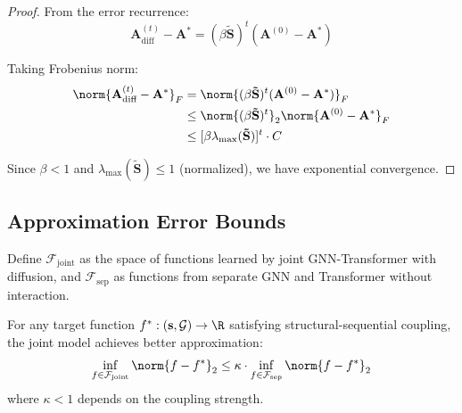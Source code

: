 \documentclass[12pt,en]{elegantpaper}
\begin{document}
\begin{proof}
From the error recurrence:
\begin{equation}
    \mathbf{A}_{\text{diff}}^{(t)} - \mathbf{A}^* = (\beta \mathbf{\tilde{S}})^t (\mathbf{A}^{(0)} - \mathbf{A}^*)
\end{equation}

Taking Frobenius norm:
\begin{align}
    \norm{\mathbf{A}_{\text{diff}}^{(t)} - \mathbf{A}^*}_F &= \norm{(\beta \mathbf{\tilde{S}})^t (\mathbf{A}^{(0)} - \mathbf{A}^*)}_F \\
    &\leq \norm{(\beta \mathbf{\tilde{S}})^t}_2 \norm{\mathbf{A}^{(0)} - \mathbf{A}^*}_F \\
    &\leq [\beta \lambda_{\max}(\mathbf{\tilde{S}})]^t \cdot C
\end{align}

Since $\beta < 1$ and $\lambda_{\max}(\mathbf{\tilde{S}}) \leq 1$ (normalized), we have exponential convergence.
\end{proof}

\subsection{Approximation Error Bounds}

\begin{definition}
Define $\mathcal{F}_{\text{joint}}$ as the space of functions learned by joint GNN-Transformer with diffusion, and $\mathcal{F}_{\text{sep}}$ as functions from separate GNN and Transformer without interaction.
\end{definition}

\begin{theorem}
\label{thm:approximation}
For any target function $f^*: (\mathbf{s}, \mathcal{G}) \to \R$ satisfying structural-sequential coupling, the joint model achieves better approximation:
\begin{equation}
    \inf_{f \in \mathcal{F}_{\text{joint}}} \norm{f - f^*}_2 \leq \kappa \cdot \inf_{f \in \mathcal{F}_{\text{sep}}} \norm{f - f^*}_2
\end{equation}
where $\kappa < 1$ depends on the coupling strength.
\end{theorem}
\end{document}
